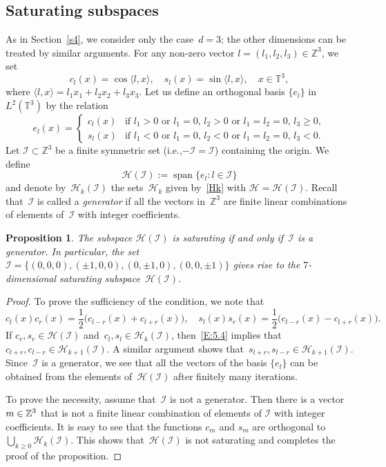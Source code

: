\documentclass[11pt]{article}
\newcommand{\ie}{i.e.,\xspace}
\theoremstyle{plain}
\newtheorem{proposition}[theorem]{Proposition}
\theoremstyle{definition}
\let\mathcal\mathscr
\theoremstyle{plain}
\numberwithin{equation}{section}
\let\lag\langle
\let\rag\rangle
\newcommand{\Z}{{\mathbb Z}}
\newcommand{\T}{{\mathbb T}}
\DeclareMathOperator{\lspan}{span}
\newcommand{\HH}{{\mathcal H}}
\newcommand{\II}{{\mathcal I}}
\begin{document}
\subsection{Saturating subspaces}
\label{S:5.2}
As in Section~\ref{s4}, we consider only the case~$d=3$; the other dimensions can be treated by similar arguments. For any non-zero vector $l=(l_1,l_2,l_3)\in \Z^3$, we set\vspace*{-3pt}
\[
c_l(x) = \cos\lag l,x\rag, \quad
s_l(x) = \sin\lag l,x\rag, \quad x\in\T^3,
\]
where $\lag l,x\rag = l_1x_1+l_2x_2+l_3x_3$. Let us define an orthogonal basis $\{e_l\}$ in~$L^2(\T^3)$ by the relation\vspace*{-3pt}
\[
e_l(x)=
\begin{cases} c_l(x) & \text{if }l_1 > 0\text{ or } l_1=0,\, l_2 > 0 \text{ or } l_1=l_2=0,\, l_3 \ge 0, \\ s_l(x) & \text{if }l_1 < 0\text{ or } l_1=0,\, l_2 < 0\text{ or } l_1=l_2=0,\, l_3 < 0.
\end{cases}
\]
Let $\II\subset\Z^3$ be a finite symmetric set (\ie $-\II=\II$) containing the origin. We define\vspace*{-3pt}%
\begin{equation}\label{E:5.3}
\HH(\II):=\lspan\{e_l:l\in\II\}
\end{equation}
and denote by~$\HH_k(\II)$ the sets~$\HH_k$ given by~\eqref{Hk} with $\HH=\HH(\II)$. Recall that~$\II$ is called a \emph{generator} if all the vectors in~$\Z^3$ are finite linear combinations of elements of~$\II$ with integer coefficients.

\begin{proposition}\label{P:5.2}
The subspace $\HH(\II)$ is saturating if and only if~$\II$ is a generator. In particular, the set $\II=\{(0,0,0), (\pm1,0,0),(0,\pm1,0),(0,0,\pm1)\}$ gives rise to the $7$-dimensional saturating subspace~$\HH(\II)$.
\end{proposition}

\begin{proof}
To prove the sufficiency of the condition, we note that\vspace*{-3pt}
\begin{equation}\label{E:5.4}
c_l(x)c_r(x)=\frac12\bigl(c_{l-r}(x)+c_{l+r}(x)\bigr), \quad
s_l(x)s_r(x)=\frac12\bigl(c_{l-r}(x)-c_{l+r}(x)\bigr).
\end{equation}
If $c_r, s_r\in\HH(\II)$ and~$c_l, s_l\in \HH_k(\II)$, then~\eqref{E:5.4} implies that $c_{l+r}, c_{l-r}\in \HH_{k+1}(\II)$. A similar argument shows that~$s_{l+r},s_{l-r}\in \HH_{k+1}(\II)$. Since~$\II$ is a generator, we see that all the vectors of the basis $\{e_l\}$ can be obtained from the elements of~$\HH(\II)$ after finitely many iterations.

To prove the necessity, assume that~$\II$ is not a generator. Then there is a vector $m\in\nobreak \Z^3$ that is not a finite linear combination of elements of $\II$ with integer coefficients. It is easy to see that the functions $c_m$ and $s_m$ are orthogonal to $\bigcup_{k\ge0} \HH_k(\II)$. This shows that~$\HH(\II)$ is not saturating and completes the proof of the proposition.
\end{proof}
\end{document}
